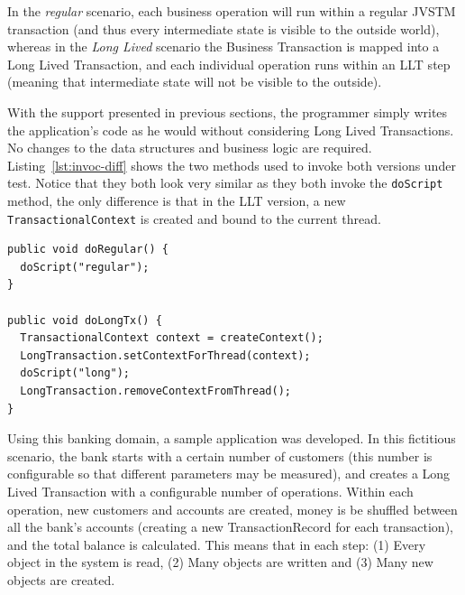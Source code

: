 In the {\it regular} scenario, each business operation will run within
a regular JVSTM transaction (and thus every intermediate state is
visible to the outside world), whereas in the {\it Long Lived}
scenario the Business Transaction is mapped into a Long Lived
Transaction, and each individual operation runs within an LLT step
(meaning that intermediate state will not be visible to the outside).

With the support presented in previous sections, the programmer simply
writes the application's code as he would without considering Long
Lived Transactions. No changes to the data structures and business
logic are required. Listing~\ref{lst:invoc-diff} shows the two methods
used to invoke both versions under test. Notice that they both look
very similar as they both invoke the \texttt{doScript} method, the
only difference is that in the LLT version, a new
\texttt{TransactionalContext} is created and bound to the current
thread.

\begin{lstlisting}[caption={Invoking the business operation},
 label={lst:invoc-diff},float]
public void doRegular() {
  doScript("regular");
}

public void doLongTx() {
  TransactionalContext context = createContext();
  LongTransaction.setContextForThread(context);
  doScript("long");
  LongTransaction.removeContextFromThread();
}
\end{lstlisting}

Using this banking domain, a sample application was developed. In this
fictitious scenario, the bank starts with a certain number of
customers (this number is configurable so that different parameters
may be measured), and creates a Long Lived Transaction with a
configurable number of operations. Within each operation, new
customers and accounts are created, money is be shuffled between all
the bank's accounts (creating a new TransactionRecord for each
transaction), and the total balance is calculated. This means that in
each step: (1) Every object in the system is read, (2) Many objects
are written and (3) Many new objects are created.

